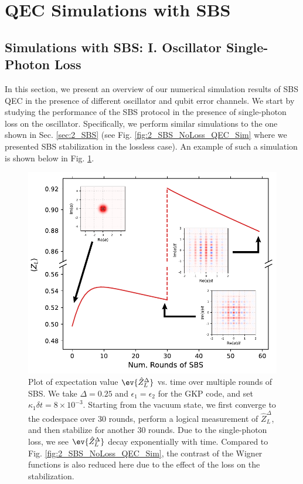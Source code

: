 


\clearpage
\section{QEC Simulations with SBS \label{sec:2_simulations_SBS}}

\subsection{Simulations with SBS: I. Oscillator Single-Photon Loss}

In this section, we present an overview of our numerical simulation results of SBS QEC in the presence of different oscillator and qubit error channels. We start by studying the performance of the SBS protocol in the presence of single-photon loss on the oscillator. Specifically, we perform similar simulations to the one shown in Sec. \ref{sec:2_SBS} (see Fig. \ref{fig:2_SBS_NoLoss_QEC_Sim} where we presented SBS stabilization in the lossless case). An example of such a simulation is shown below in Fig. \ref{fig:2_SBS_Lossy_QEC_Sim}.

\begin{figure}[h]
    \centering
    \includegraphics[width=0.85\linewidth]{Figures/2/SBS_Lossy_QEC_Sim.pdf}
    \caption{Plot of expectation value $\ev{\hat{Z}_L^\Delta}$ vs. time over multiple rounds of SBS. We take $\Delta = 0.25$ and $\epsilon_1 = \epsilon_2$ for the GKP code, and set $\kappa_1\delta t = 8\times 10^{-3}$. Starting from the vacuum state, we first converge to the codespace over 30 rounds, perform a logical measurement of $\hat{Z}_L^\Delta$, and then stabilize for another 30 rounds. Due to the single-photon loss, we see $\ev{\hat{Z}_L^\Delta}$ decay exponentially with time. Compared to Fig. \ref{fig:2_SBS_NoLoss_QEC_Sim}, the contrast of the Wigner functions is also reduced here due to the effect of the loss on the stabilization.}
    \label{fig:2_SBS_Lossy_QEC_Sim}
\end{figure}

